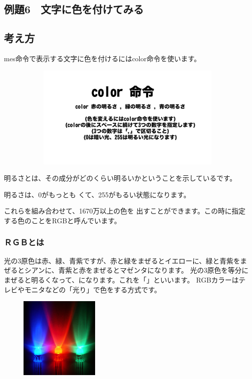 \clearpage

\subsection{例題6　文字に色を付けてみる}

\subsection*{考え方}

mes命令で表示する文字に色を付けるにはcolor命令を使います。

\begin{figure}[H]
    \begin{center}
        \includegraphics[keepaspectratio,width=12.277cm,height=5.08cm]{text02-img/text02-img030.png}
    \end{center}
\end{figure}

明るさとは、その成分がどのくらい明るいかということを示しているです。

明るさは、0がもっとも
くて、255がもるい状態になります。

これらを組み合わせて、1670万以上の色を
出すことができます。この時に指定する色のことをRGBと呼んでいます。

\subsubsection*{ＲＧＢとは}

光の3原色は赤、緑、青紫ですが、赤と緑をまぜるとイエローに、緑と青紫をまぜるとシアンに、青紫と赤をまぜるとマゼンタになります。
光の3原色を等分にまぜると明るくなって、になります。これを「」といいます。
RGBカラーはテレビやモニタなどの「光り」で色をする方式です。

\begin{figure}[H]
    \begin{center}
        \includegraphics[keepaspectratio,width=3.854cm,height=3.988cm]{text02-img/text02-img033.jpg}
    \end{center}
\end{figure}

